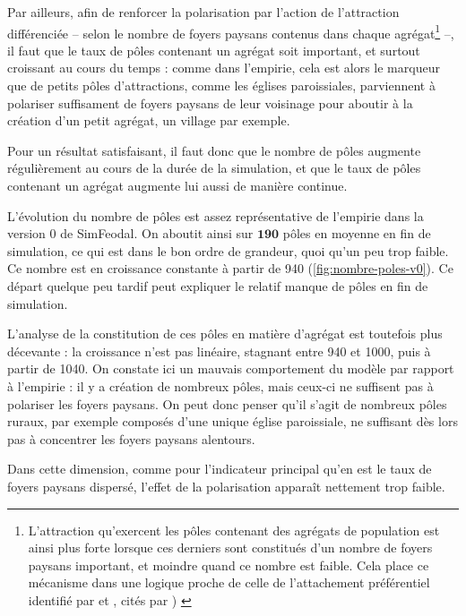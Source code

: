 Par ailleurs, afin de renforcer la polarisation par l'action de l'attraction différenciée -- selon le nombre de foyers paysans contenus dans chaque agrégat\footnote{\label{ftn:preferential-attachment}
L'attraction qu'exercent les pôles contenant des agrégats de population est ainsi plus forte lorsque ces derniers sont constitués d'un nombre de foyers paysans important, et moindre quand ce nombre est faible.
Cela place ce mécanisme dans une logique proche de celle de l'attachement préférentiel identifié par \cite{yule1925ii} et \cite{simon1955class}, cités par \cite[93]{schmittModelisationDynamiqueSystemes2014}) \label{ftn:attachement-preferentiel}
} --, il faut que le taux de pôles contenant un agrégat soit important, et surtout croissant au cours du temps :
comme dans l'empirie, cela est alors le marqueur que de petits pôles d'attractions, comme les églises paroissiales, parviennent à polariser suffisament de foyers paysans de leur voisinage pour aboutir à la création d'un petit agrégat, un village par exemple.

Pour un résultat satisfaisant, il faut donc que le nombre de pôles augmente régulièrement au cours de la durée de la simulation, et que le taux de pôles contenant un agrégat augmente lui aussi de manière continue.

\begin{mdframed}[backgroundcolor=gray!10,footnoteinside=false]
L'évolution du nombre de pôles est assez représentative de l'empirie dans la version 0 de SimFeodal.
On aboutit ainsi sur $\textbf{190}$ pôles en moyenne en fin de simulation, ce qui est dans le bon ordre de grandeur, quoi qu'un peu trop faible.
Ce nombre est en croissance constante à partir de 940 (\cref{fig:nombre-poles-v0}).
Ce départ quelque peu tardif peut expliquer le relatif manque de pôles en fin de simulation.

L'analyse de la constitution de ces pôles en matière d'agrégat est toutefois plus décevante :
la croissance n'est pas linéaire, stagnant entre 940 et 1000, puis à partir de 1040.
On constate ici un mauvais comportement du modèle par rapport à l'empirie :
il y a création de nombreux pôles, mais ceux-ci ne suffisent pas à polariser les foyers paysans.
On peut donc penser qu'il s'agit de nombreux pôles ruraux, par exemple composés d'une unique église paroissiale, ne suffisant dès lors pas à concentrer les foyers paysans alentours.

Dans cette dimension, comme pour l'indicateur principal qu'en est le taux de foyers paysans dispersé, l'effet de la polarisation apparaît nettement trop faible.
\end{mdframed}


